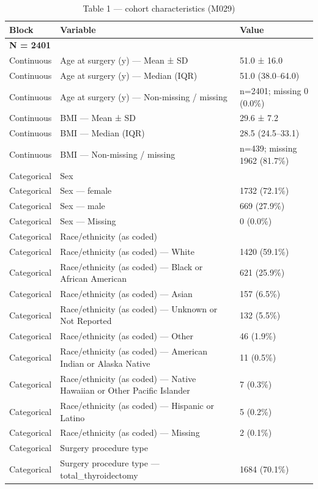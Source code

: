 \begin{table}[htbp]
\centering
\caption{Table 1 — cohort characteristics (M029)}
\label{tab:table1\_m029}
\begin{tabular}{lll}
\toprule
Block & Variable & Value \\
\midrule
\multicolumn{3}{l}{\textbf{N = 2401}} \\
Continuous & Age at surgery (y) — Mean ± SD & 51.0 ± 16.0 \\
Continuous & Age at surgery (y) — Median (IQR) & 51.0 (38.0–64.0) \\
Continuous & Age at surgery (y) — Non-missing / missing & n=2401; missing 0 (0.0\%) \\
Continuous & BMI — Mean ± SD & 29.6 ± 7.2 \\
Continuous & BMI — Median (IQR) & 28.5 (24.5–33.1) \\
Continuous & BMI — Non-missing / missing & n=439; missing 1962 (81.7\%) \\
Categorical & Sex &  \\
Categorical & Sex — female & 1732 (72.1\%) \\
Categorical & Sex — male & 669 (27.9\%) \\
Categorical & Sex — Missing & 0 (0.0\%) \\
Categorical & Race/ethnicity (as coded) &  \\
Categorical & Race/ethnicity (as coded) — White & 1420 (59.1\%) \\
Categorical & Race/ethnicity (as coded) — Black or African American & 621 (25.9\%) \\
Categorical & Race/ethnicity (as coded) — Asian & 157 (6.5\%) \\
Categorical & Race/ethnicity (as coded) — Unknown or Not Reported & 132 (5.5\%) \\
Categorical & Race/ethnicity (as coded) — Other & 46 (1.9\%) \\
Categorical & Race/ethnicity (as coded) — American Indian or Alaska Native & 11 (0.5\%) \\
Categorical & Race/ethnicity (as coded) — Native Hawaiian or Other Pacific Islander & 7 (0.3\%) \\
Categorical & Race/ethnicity (as coded) — Hispanic or Latino & 5 (0.2\%) \\
Categorical & Race/ethnicity (as coded) — Missing & 2 (0.1\%) \\
Categorical & Surgery procedure type &  \\
Categorical & Surgery procedure type — total\_thyroidectomy & 1684 (70.1\%) \\

\end{tabular}
\end{table}
